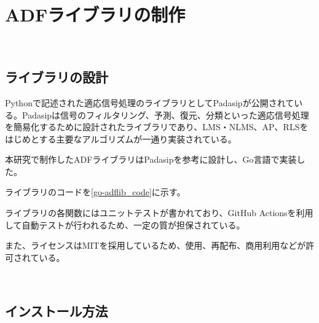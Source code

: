 





\section{ADFライブラリの制作}\label{create-adflib}

\
\subsection{ライブラリの設計}\label{design-adf}

Pythonで記述された適応信号処理のライブラリとしてPadasip\cite{padasip}が公開されている。Padasipは信号のフィルタリング、予測、復元、分類といった適応信号処理を簡易化するために設計されたライブラリであり、LMS・NLMS、AP、RLSをはじめとする主要なアルゴリズムが一通り実装されている。

本研究で制作したADFライブラリはPadasipを参考に設計し、Go言語で実装した。

ライブラリのコードを\ref{go-adflib_code}に示す。

ライブラリの各関数にはユニットテストが書かれており、GitHub
Actionsを利用して自動テストが行われるため、一定の質が担保されている。

また、ライセンスはMITを採用しているため、使用、再配布、商用利用などが許可されている。%

\
\subsection{インストール方法}\label{how-to-install}

